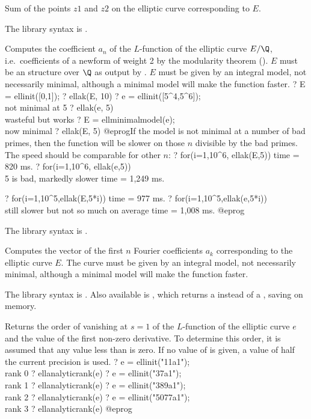 \label{se:elladd}
Sum of the points $z1$ and $z2$ on the
elliptic curve corresponding to $E$.

The library syntax is .

\label{se:ellak}
Computes the coefficient $a_n$ of the $L$-function of the elliptic curve
$E/\Q$, i.e.~coefficients of a newform of weight 2 by the modularity theorem
(). $E$ must be an  structure
over $\Q$ as output by . $E$ must be given by an integral model,
not necessarily minimal, although a minimal model will make the function
faster.
\bprog
? E = ellinit([0,1]);
? ellak(E, 10)
? e = ellinit([5^4,5^6]); \\ not minimal at 5
? ellak(e, 5) \\ wasteful but works
? E = ellminimalmodel(e); \\ now minimal
? ellak(E, 5)
@eprog\noindent If the model is not minimal at a number of bad primes, then
the function will be slower on those $n$ divisible by the bad primes.
The speed should be comparable for other $n$:
\bprog
? for(i=1,10^6, ellak(E,5))
time = 820 ms.
? for(i=1,10^6, ellak(e,5)) \\ 5 is bad, markedly slower
time = 1,249 ms.

? for(i=1,10^5,ellak(E,5*i))
time = 977 ms.
? for(i=1,10^5,ellak(e,5*i)) \\ still slower but not so much on average
time = 1,008 ms.
@eprog

The library syntax is .

\label{se:ellan}
Computes the vector of the first $n$ Fourier coefficients $a_k$
corresponding to the elliptic curve $E$. The curve must be given by an
integral model, not necessarily minimal, although a minimal model will make
the function faster.

The library syntax is .
Also available is , which
returns a  instead of a , saving on memory.

\label{se:ellanalyticrank}
Returns the order of vanishing at $s=1$ of the $L$-function of the
elliptic curve $e$ and the value of the first non-zero derivative. To
determine this order, it is assumed that any value less than  is
zero. If no value of  is given, a value of half the current
precision is used.
\bprog
? e = ellinit("11a1"); \\ rank 0
? ellanalyticrank(e)
? e = ellinit("37a1"); \\ rank 1
? ellanalyticrank(e)
? e = ellinit("389a1"); \\ rank 2
? ellanalyticrank(e)
? e = ellinit("5077a1"); \\ rank 3
? ellanalyticrank(e)
@eprog

